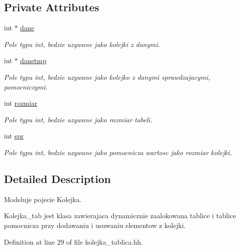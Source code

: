 \subsection*{Private Attributes}
\begin{DoxyCompactItemize}
\item 
int $\ast$ \hyperlink{classkolejka__tablica_a3db25a7939b4a9d96127b29b753d9010}{dane}
\begin{DoxyCompactList}\small\item\em Pole typu int, bedzie uzywane jako kolejki z danymi. \end{DoxyCompactList}\item 
int $\ast$ \hyperlink{classkolejka__tablica_a3701ca21511ad3acdecf4cce08625eba}{danetmp}
\begin{DoxyCompactList}\small\item\em Pole typu int, bedzie uzywane jako kolejko z danymi sprawdzajacymi, pomocniczymi. \end{DoxyCompactList}\item 
int \hyperlink{classkolejka__tablica_a1cec0ee294c7afb2c6b7ba5589cb8e38}{rozmiar}
\begin{DoxyCompactList}\small\item\em Pole typu int, bedzie uzywane jako rozmiar tabeli. \end{DoxyCompactList}\item 
int \hyperlink{classkolejka__tablica_afbf8e02fb0cbdc2674fc68da04d8202d}{spr}
\begin{DoxyCompactList}\small\item\em Pole typu int, bedzie uzywane jako pomocnicza wartosc jako rozmiar kolejki. \end{DoxyCompactList}\end{DoxyCompactItemize}


\subsection{Detailed Description}
Modeluje pojecie Kolejka. 

Kolejka\-\_\-tab jest klasa zawierajaca dynamicznie zaalokowana tablice i tablice pomocnicza przy dodawaniu i usuwaniu elementow z kolejki. 

Definition at line 29 of file kolejka\-\_\-tablica.\-hh.



